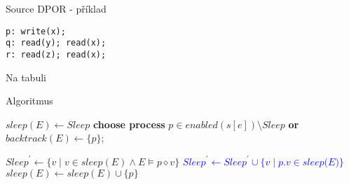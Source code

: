 \documentclass[11pt]{beamer}
\begin{document}
\begin{frame}[fragile]{Source DPOR - příklad}
\begin{lstlisting}
p: write(x);
q: read(y); read(x);
r: read(z); read(x);
\end{lstlisting}
\pause
Na tabuli
\end{frame}




%
\begin{frame}[fragile]{Algoritmus}

\begin{algorithmic} \small
  \State $sleep(E) \gets Sleep$
  \State \textbf{choose process} $p \in \textit{enabled}(s[e]) \setminus \textit{Sleep}$
  \textbf{or} \Return
  \State $\textit{backtrack}(E) \gets \{ p \}$;
  
    \State {}
  
    \State $\textit{Sleep}^\prime \gets \{ v \mid v \in \textit{sleep}(E) \land E \vDash p \diamond v \}$
    \State \textcolor{blue}{$\textit{Sleep}^\prime \gets \textit{Sleep}^\prime \cup \{ v \mid p.v \in \textit{sleep(E)} \}$}
    \State {}
    \State $\textit{sleep}(E) \gets \textit{sleep}(E) \cup \{ p \}$


  \EndWhile  
\EndFunction
\end{algorithmic}
\end{frame}
\end{document}
